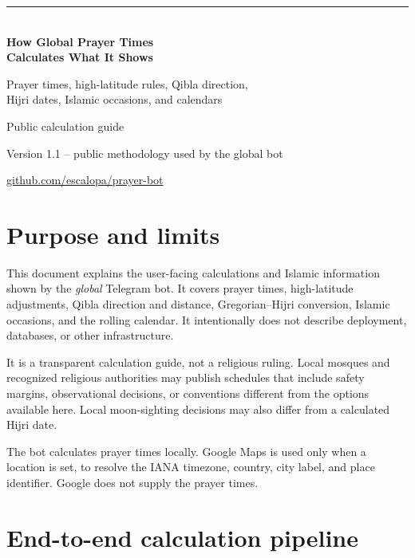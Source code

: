 \documentclass[11pt,a4paper]{article}
\newcommand{\note}[1]{%
  \begin{center}\colorbox{soft}{\parbox{0.92\linewidth}{\small #1}}\end{center}}
\begin{document}
\begin{titlepage}
  \color{ink}
  \vspace*{18mm}
  {\color{green}\rule{22mm}{2.5pt}}\\[10mm]
  {\Huge\bfseries How Global Prayer Times\\Calculates What It Shows}\par
  \vspace{6mm}
  {\Large Prayer times, high-latitude rules, Qibla direction,\\Hijri dates, Islamic occasions, and calendars}\par
  \vfill
  {\large Public calculation guide}\par
  \vspace{2mm}
  {\color{muted}Version 1.1 -- public methodology used by the global bot}\par
  \vspace{12mm}
  \href{https://github.com/escalopa/prayer-bot}{github.com/escalopa/prayer-bot}
\end{titlepage}

\tableofcontents
\newpage

\section{Purpose and limits}

This document explains the user-facing calculations and Islamic information shown by the \emph{global} Telegram bot. It covers prayer times, high-latitude adjustments, Qibla direction and distance, Gregorian--Hijri conversion, Islamic occasions, and the rolling calendar. It intentionally does not describe deployment, databases, or other infrastructure.

It is a transparent calculation guide, not a religious ruling. Local mosques and recognized religious authorities may publish schedules that include safety margins, observational decisions, or conventions different from the options available here. Local moon-sighting decisions may also differ from a calculated Hijri date.

\note{The bot calculates prayer times locally. Google Maps is used only when a location is set, to resolve the IANA timezone, country, city label, and place identifier. Google does not supply the prayer times.}

\section{End-to-end calculation pipeline}
\end{document}
